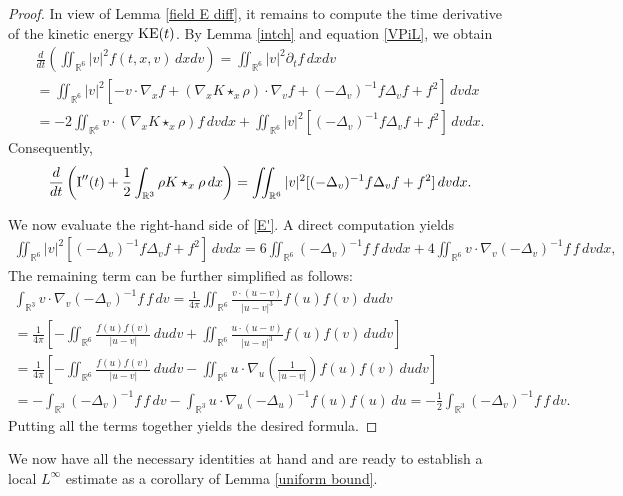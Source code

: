 \documentclass[reqno,11pt,final]{amsart}
\theoremstyle{plain}
\numberwithin{equation}{section}
\numberwithin{theorem}{section}
\begin{document}
\begin{proof}
In view of Lemma \ref{field E diff}, it remains to compute the time derivative of the kinetic energy $\textup{KE}(t)$. By Lemma \ref{intch} and equation \eqref{VPiL}, we obtain
\begin{multline*}
\frac{d}{dt}\left(\iint_{\mathbb{R}^6} |v|^2f(t,x,v)\,dxdv\right)= \iint_{\mathbb{R}^6} |v|^2\partial_tf\,dxdv\\
=\iint_{\mathbb{R}^6} |v|^2[-v\cdot\nabla_xf+(\nabla_xK\star_x\rho)\cdot \nabla_vf+(-\Delta_v)^{-1}f\Delta_vf+f^2]\,dvdx\\
=-2\iint_{\mathbb{R}^6} v\cdot(\nabla_xK\star_x\rho)f\,dvdx+\iint_{\mathbb{R}^6} |v|^2[(-\Delta_v)^{-1}f\Delta_vf+f^2]\,dvdx.
\end{multline*}Consequently,
\begin{align}\label{E'}
\frac{d}{dt}\left(\textup{I}''(t) + \frac{1}{2} \int_{\mathbb{R}^3} \rho K\star_x \rho\,dx\right)=\iint_{\mathbb{R}^6} |v|^2[(-\Delta_v)^{-1}f\Delta_vf+f^2]\,dvdx.
\end{align}

We now evaluate the right-hand side of \eqref{E'}. A direct computation yields
\begin{multline*}
\iint_{\mathbb{R}^6} |v|^2[(-\Delta_v)^{-1}f\Delta_vf+f^2]\,dvdx 
= 6\iint_{\mathbb{R}^6} (-\Delta_v)^{-1}f\,f\,dvdx+4\iint_{\mathbb{R}^6} v\cdot\nabla_v(-\Delta_v)^{-1}f\,f\,dvdx,
\end{multline*}The remaining term can be further simplified as follows:
\begin{multline*}
\int_{\mathbb{R}^3} v\cdot\nabla_v(-\Delta_v)^{-1}f\,f\,dv=\frac{1}{4\pi}\iint_{\mathbb{R}^6} \frac{v\cdot(u-v)}{|u-v|^3}f(u)f(v)\,dudv\\
=\frac{1}{4\pi}\left[-\iint_{\mathbb{R}^6}\frac{f(u)f(v)}{|u-v|}\,dudv+\iint_{\mathbb{R}^6}\frac{u\cdot(u-v)}{|u-v|^3}f(u)f(v)\,dudv\right]\\
=\frac{1}{4\pi}\left[-\iint_{\mathbb{R}^6}\frac{f(u)f(v)}{|u-v|}\,dudv-\iint_{\mathbb{R}^6} u\cdot\nabla_u\left(\frac{1}{|u-v|}\right)f(u)f(v)\,dudv\right]\\
=-\int_{\mathbb{R}^3} (-\Delta_v)^{-1}f\,f\,dv-\int_{\mathbb{R}^3} u\cdot\nabla_u(-\Delta_u)^{-1}f(u)f(u)\,du
=-\frac{1}{2}\int_{\mathbb{R}^3} (-\Delta_v)^{-1}f\,f\,dv.
\end{multline*}Putting all the terms together yields the desired formula.
\end{proof}

We now have all the necessary identities at hand and are ready to establish a
local $L^\infty$ estimate as a corollary of Lemma \ref{uniform bound}.
\end{document}
